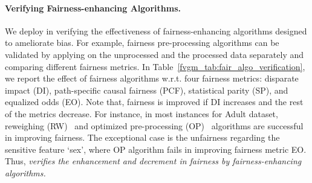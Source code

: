 \paragraph{Verifying Fairness-enhancing Algorithms.} We deploy {\fvgm} in verifying the effectiveness of fairness-enhancing algorithms designed to ameliorate bias. For example, fairness 
pre-processing algorithms can be validated by applying {\fvgm} on the unprocessed and the processed data separately and comparing different fairness metrics. In Table~\ref{fvgm_tab:fair_algo_verification}, we report the effect of fairness algorithms w.r.t. four fairness metrics: disparate impact (DI), path-specific causal fairness (PCF), statistical parity (SP), and equalized odds (EO). Note that, fairness is improved if DI increases and the rest of the metrics decrease. For instance, in most instances for Adult dataset, reweighing (RW)~\cite{kamiran2012data} and optimized pre-processing (OP)~\cite{calmon2017optimized} algorithms are successful in improving fairness. The exceptional case is the unfairness regarding the sensitive feature `sex', where OP algorithm fails in improving fairness metric EO. Thus, \textit{{\fvgm} verifies the enhancement and decrement in fairness by  fairness-enhancing algorithms. }



